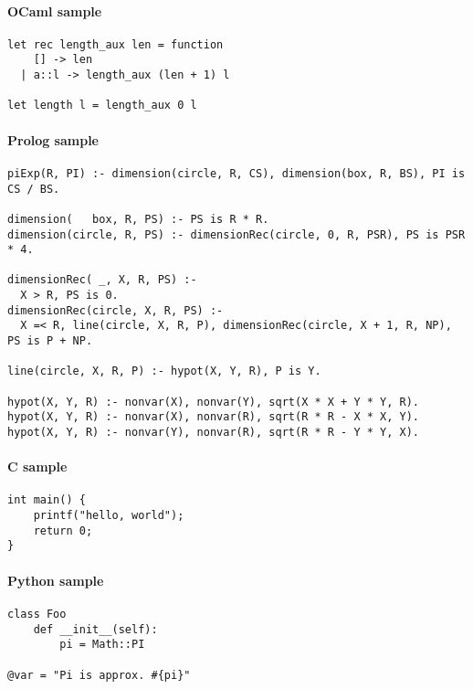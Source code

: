 \documentclass[langage=french,lecture=thpr]{ensldocument}
\begin{document}
\paragraph{OCaml sample}

\begin{verbatim}
let rec length_aux len = function
    [] -> len
  | a::l -> length_aux (len + 1) l

let length l = length_aux 0 l
\end{verbatim}

\paragraph{Prolog sample}

\begin{verbatim}
piExp(R, PI) :- dimension(circle, R, CS), dimension(box, R, BS), PI is CS / BS.

dimension(   box, R, PS) :- PS is R * R.
dimension(circle, R, PS) :- dimensionRec(circle, 0, R, PSR), PS is PSR * 4.

dimensionRec( _, X, R, PS) :-
  X > R, PS is 0.
dimensionRec(circle, X, R, PS) :-
  X =< R, line(circle, X, R, P), dimensionRec(circle, X + 1, R, NP), PS is P + NP.

line(circle, X, R, P) :- hypot(X, Y, R), P is Y.

hypot(X, Y, R) :- nonvar(X), nonvar(Y), sqrt(X * X + Y * Y, R).
hypot(X, Y, R) :- nonvar(X), nonvar(R), sqrt(R * R - X * X, Y).
hypot(X, Y, R) :- nonvar(Y), nonvar(R), sqrt(R * R - Y * Y, X).
\end{verbatim}

\paragraph{C sample}

\begin{verbatim}
int main() {
    printf("hello, world");
    return 0;
}
\end{verbatim}

\paragraph{Python sample}

\begin{verbatim}
class Foo
    def __init__(self):
        pi = Math::PI

@var = "Pi is approx. #{pi}"
\end{verbatim}

\blinddocument
\end{document}
